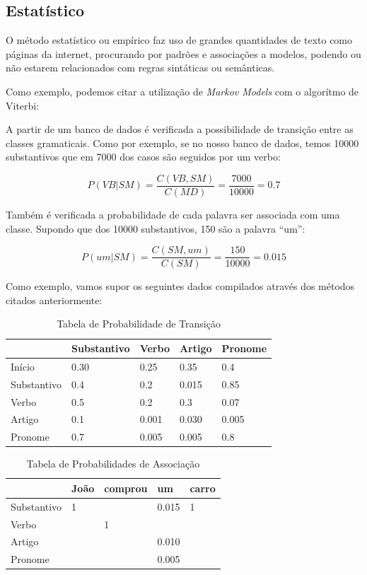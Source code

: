 \subsection{Estatístico} 
O método estatístico ou empírico faz uso de grandes
quantidades de texto como páginas da internet, procurando por padrões e
associações a modelos, podendo ou não estarem relacionados com regras sintáticas
ou semânticas. 

Como exemplo, podemos citar a utilização de \textit{Markov Models} com o
algorítmo de Viterbi:

A partir de um banco de dados é verificada a possibilidade de
transição entre as classes gramaticais. Como por exemplo, se no nosso banco de
dados, temos 10000 substantivos que em 7000 dos casos são seguidos por um verbo:

\[ P(VB|SM) = \frac{C(VB,SM)}{C(MD)} = \frac{7000}{10000} = 0.7 \]

Também é verificada a probabilidade de cada palavra ser associada com uma
classe. Supondo que dos 10000 substantivos, 150 são a palavra ``um'':

\[ P(um|SM) = \frac{C(SM,um)}{C(SM)} = \frac{150}{10000} = 0.015 \]

Como exemplo, vamos supor os seguintes dados compilados através dos métodos
citados anteriormente:

\begin{table}[htb]
\centering
\label{my-label}
\begin{tabular}{|l|l|l|l|l|}
\hline
            & Substantivo & Verbo & Artigo & Pronome \\ \hline
Início      & 0.30        & 0.25  & 0.35   & 0.4     \\ \hline
Substantivo & 0.4         & 0.2   & 0.015  & 0.85    \\ \hline
Verbo       & 0.5         & 0.2   & 0.3    & 0.07    \\ \hline
Artigo      & 0.1         & 0.001 & 0.030  & 0.005   \\ \hline
Pronome     & 0.7         & 0.005 & 0.005  & 0.8     \\ \hline
\end{tabular}
\caption{Tabela de Probabilidade de Transição}
\end{table} 

\begin{table}[htb]
\centering
\label{my-label2}
\begin{tabular}{|l|l|l|l|l|}
\hline
            & João & comprou & um    & carro \\ \hline
Substantivo & 1    &         & 0.015 & 1     \\ \hline
Verbo       &      & 1       &       &       \\ \hline
Artigo      &      &         & 0.010 &       \\ \hline
Pronome     &      &         & 0.005 &       \\ \hline
\end{tabular}

\caption{Tabela de Probabilidades de Associação}
\end{table}

